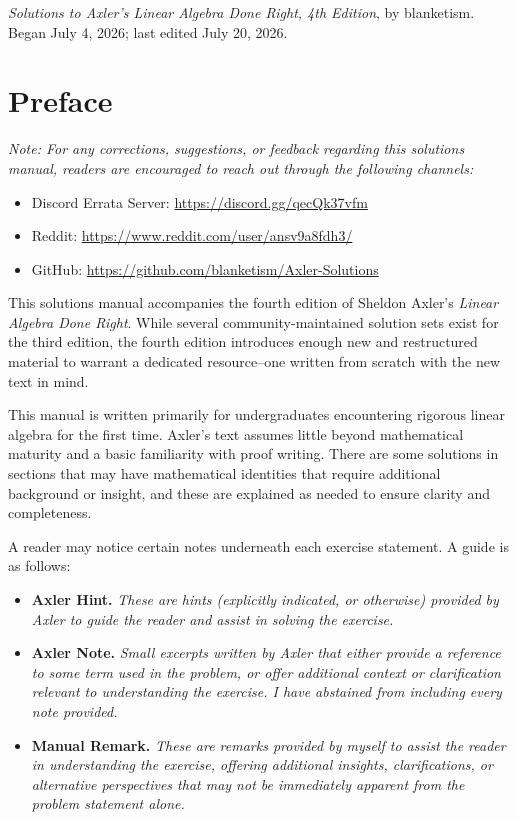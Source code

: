 \noindent\emph{Solutions to Axler's Linear Algebra Done Right, 4th Edition}, by
blanketism. Began July 4, 2026; last edited July 20, 2026.

\section*{Preface}

\emph{Note: For any corrections, suggestions, or feedback regarding this
solutions manual, readers are encouraged to reach out through the following
channels:}
\begin{itemize}
\item Discord Errata Server: \url{https://discord.gg/qecQk37vfm}
\item Reddit: \url{https://www.reddit.com/user/ansv9a8fdh3/}
\item GitHub: \url{https://github.com/blanketism/Axler-Solutions}
\end{itemize}

This solutions manual accompanies the fourth edition of Sheldon Axler's
\emph{Linear Algebra Done Right}. While several community-maintained solution
sets exist for the third edition, the fourth edition introduces enough new and
restructured material to warrant a dedicated resource--one written from scratch
with the new text in mind.

This manual is written primarily for undergraduates encountering rigorous
linear algebra for the first time. Axler's text assumes little beyond
mathematical maturity and a basic familiarity with proof writing. There are
some solutions in sections that may have mathematical identities that require
additional background or insight, and these are explained as needed to ensure
clarity and completeness.

A reader may notice certain notes underneath each exercise statement. A guide
is as follows:
\begin{itemize}
\item \textbf{Axler Hint.} \emph{These are hints (explicitly indicated, or
  otherwise) provided by Axler to guide the reader and assist in solving the
  exercise.}
\item \textbf{Axler Note.} \emph{Small excerpts written by Axler that either
  provide a reference to some term used in the problem, or offer additional
  context or clarification relevant to understanding the exercise. I have
  abstained from including every note provided.}
\item \textbf{Manual Remark.} \emph{These are remarks provided by myself to
  assist the reader in understanding the exercise, offering additional
  insights, clarifications, or alternative perspectives that may not be
  immediately apparent from the problem statement alone.}
\end{itemize}


